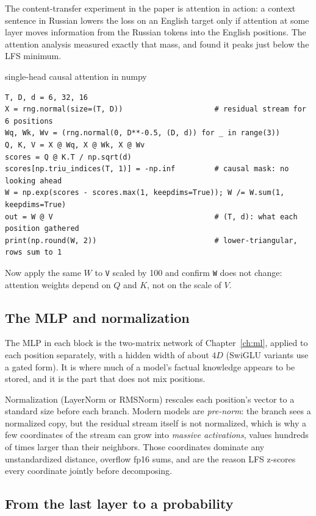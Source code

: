 The content-transfer experiment in the paper is attention in action: a
context sentence in Russian lowers the loss on an English target only if
attention at some layer moves information from the Russian tokens into the
English positions. The attention analysis measured exactly that mass, and
found it peaks just below the LFS minimum.

\begin{exercise}{single-head causal attention in numpy}
\begin{lstlisting}
T, D, d = 6, 32, 16
X = rng.normal(size=(T, D))                     # residual stream for 6 positions
Wq, Wk, Wv = (rng.normal(0, D**-0.5, (D, d)) for _ in range(3))
Q, K, V = X @ Wq, X @ Wk, X @ Wv
scores = Q @ K.T / np.sqrt(d)
scores[np.triu_indices(T, 1)] = -np.inf         # causal mask: no looking ahead
W = np.exp(scores - scores.max(1, keepdims=True)); W /= W.sum(1, keepdims=True)
out = W @ V                                     # (T, d): what each position gathered
print(np.round(W, 2))                           # lower-triangular, rows sum to 1
\end{lstlisting}
Now apply the same $W$ to \texttt{V} scaled by 100 and confirm \texttt{W} does
not change: attention weights depend on $Q$ and $K$, not on the scale of $V$.
\end{exercise}

\subsection{The MLP and normalization}

The MLP in each block is the two-matrix network of Chapter~\ref{ch:ml}, applied
to each position separately, with a hidden width of about $4D$ (SwiGLU
variants use a gated form). It is where much of a model's factual knowledge
appears to be stored, and it is the part that does not mix positions.

Normalization (LayerNorm or RMSNorm) rescales each position's vector to a
standard size before each branch. Modern models are \emph{pre-norm}: the
branch sees a normalized copy, but the residual stream itself is not
normalized, which is why a few coordinates of the stream can grow into
\emph{massive activations}, values hundreds of times larger than their
neighbors. Those coordinates dominate any unstandardized distance, overflow
fp16 sums, and are the reason LFS z-scores every coordinate jointly before
decomposing.

\subsection{From the last layer to a probability}

